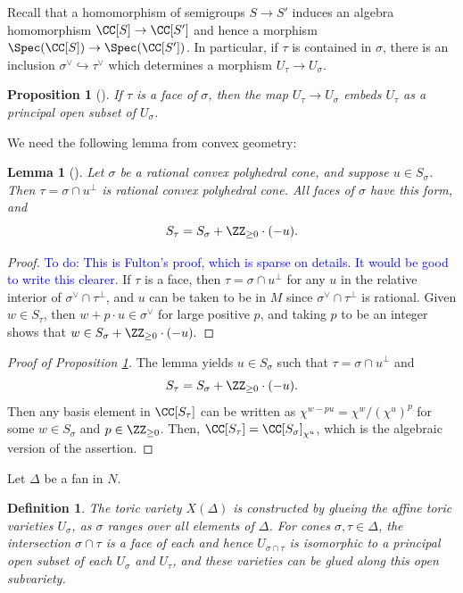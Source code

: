 \documentclass[12pt]{amsart}
\newcommand{\todo}[1]{\noindent  \textcolor{blue}{To do: #1}}
\theoremstyle{plain}
\newtheorem{definition}[theorem]{Definition}
\newtheorem{lemma}[theorem]{Lemma}
\newtheorem{proposition}[theorem]{Proposition}
\begin{document}
Recall that a homomorphism of semigroups $S \to S'$ induces an algebra homomorphism $\CC[S] \to \CC[S']$ and hence a morphism $\Spec(\CC[S]) \to \Spec(\CC[S'])$.
In particular, if $\tau$ is contained in $\sigma$, there is an inclusion $\sigma^\vee \hookrightarrow \tau^\vee$ which determines a morphism $U_\tau \to U_\sigma$.

\begin{proposition}[{\cite[\S 1.3]{Fulton93}}]\label{faceembedding}
If $\tau$ is a face of $\sigma$, then the map $U_\tau \to U_\sigma$ embeds $U_\tau$ as a principal open subset of $U_\sigma$.
\end{proposition}

We need the following lemma from convex geometry:

\begin{lemma}[{\cite[\S 1.2]{Fulton93}}]
Let $\sigma$ be a rational convex polyhedral cone, and suppose $u \in S_\sigma$.
Then $\tau = \sigma \cap u^\perp$ is rational convex polyhedral cone. 
All faces of $\sigma$ have this form, and
$$S_\tau = S_\sigma + \ZZ_{\ge 0} \cdot (-u).$$
\end{lemma}
\begin{proof}
\todo{This is Fulton's proof, which is sparse on details. It would be good to write this clearer.}
If $\tau$ is a face, then $\tau = \sigma \cap u^\perp$ for any $u$ in the relative interior of $\sigma^\vee \cap \tau^\perp$, and $u$ can be taken to be in $M$ since $\sigma^\vee \cap \tau^\perp$ is rational.
Given $w\in S_\tau$, then $w + p \cdot u \in \sigma^\vee$ for large positive $p$, and taking $p$ to be an integer shows that $w \in S_\sigma + \ZZ_{\ge 0} \cdot (-u).$
\end{proof}

\begin{proof}[Proof of Proposition \ref{faceembedding}]
The lemma yields $u \in S_\sigma$ such that $\tau=\sigma\cap u^\perp$ and
$$S_\tau = S_\sigma + \ZZ_{\ge 0} \cdot (-u).$$
Then any basis element in $\CC[S_\tau]$ can be written as $\chi^{w - p u} = \chi^w / (\chi^u)^p$ for some $w \in S_\sigma$ and $p \in \ZZ_{\ge 0}$.
Then, $\CC[S_\tau] = \CC[S_\sigma]_{\chi^u}$, which is the algebraic version of the assertion.
\end{proof}

Let $\Delta$ be a fan in $N$.

\begin{definition}
The toric variety $X(\Delta)$ is constructed by glueing the affine toric varieties $U_\sigma$, as $\sigma$ ranges over all elements of $\Delta$.
For cones $\sigma, \tau \in \Delta$, the intersection $\sigma \cap \tau$ is a face of each and hence $U_{\sigma \cap \tau}$ is isomorphic to a principal open subset of each $U_\sigma$ and $U_\tau$, and these varieties can be glued along this open subvariety.
\end{definition}
\end{document}
